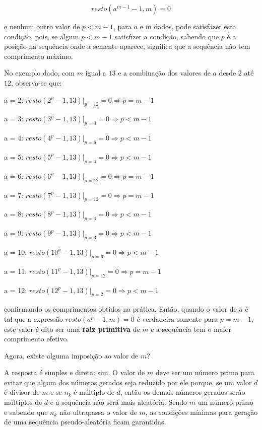 \documentclass[a4paper,12pt,oneside,onecolumn]{uerj/uerj}
\begin{document}
\begin{equation}
resto(a^{m-1}-1,m)=0
\end{equation}

\noindent e nenhum outro valor de $p<m-1$, para $a$ e $m$ dados, pode satisfazer esta condição, pois, se algum $p<m-1$ satisfizer a condição, sabendo que $p$ é a posição na sequência onde a semente aparece, significa que a sequência não tem comprimento máximo. 

No exemplo dado, com $m$ igual a $13$ e a combinação dos valores de $a$ desde $2$ até $12$, observa-se que:

\begin{lcircp}
    \item a = 2: $resto(2^{p}-1,13)\Big\vert_{p=12} = 0 \Rightarrow p = m-1$
    \item a = 3: $resto(3^{p}-1,13)\Big\vert_{p=3} = 0 \Rightarrow p < m-1$
    \item a = 4: $resto(4^{p}-1,13)\Big\vert_{p=6} = 0 \Rightarrow p < m-1$
    \item a = 5: $resto(5^{p}-1,13)\Big\vert_{p=4} = 0 \Rightarrow p < m-1$
    \item a = 6: $resto(6^{p}-1,13)\Big\vert_{p=12} = 0 \Rightarrow p = m-1$
    \item a = 7: $resto(7^{p}-1,13)\Big\vert_{p=12} = 0 \Rightarrow p = m-1$
    \item a = 8: $resto(8^{p}-1,13)\Big\vert_{p=4} = 0 \Rightarrow p < m-1$
    \item a = 9: $resto(9^{p}-1,13)\Big\vert_{p=3} = 0 \Rightarrow p < m-1$
    \item a = 10: $resto(10^{p}-1,13)\Big\vert_{p=6} = 0 \Rightarrow p < m-1$
    \item a = 11: $resto(11^{p}-1,13)\Big\vert_{p=12} = 0 \Rightarrow p = m-1$
    \item a = 12: $resto(12^{p}-1,13)\Big\vert_{p=2} = 0 \Rightarrow p < m-1$\\
\end{lcircp}

\noindent confirmando os comprimentos obtidos na prática. Então, quando o valor de $a$ é tal que a expressão $resto(a^{p}-1,m)=0$ é verdadeira somente para $p=m-1$, este valor é dito ser uma \textbf{raiz primitiva} de $m$ e a sequência tem o maior comprimento efetivo. 

Agora, existe alguma imposição ao valor de $m$?

A resposta é simples e direta: sim. O valor de $m$ deve ser um número primo para evitar que algum dos números gerados seja reduzido por ele porque, se um valor $d$ é divisor de $m$ e se $n_k$ é múltiplo de $d$, então os demais números gerados serão múltiplos de $d$ e a sequência não será mais aleatória. Sendo $m$ um número primo e sabendo que $n_k$ não ultrapassa o valor de $m$, as condições mínimas para geração de uma sequência pseudo-aleatória ficam garantidas.
\end{document}
